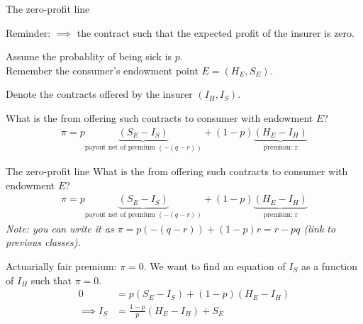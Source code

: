 \begin{frame}{The zero-profit line}

    Reminder:  $\implies$ the contract such that the expected profit of the insurer is zero.\\
    \vspace{2mm}
    \pause

    Assume the probablity of being sick is $p$.\\
    Remember the consumer's endowment point $E = (H_E, S_E)$.\\
    \vspace{2mm}
    \pause

    Denote the contracts offered by the insurer $(I_H, I_S)$.\\
    \vspace{2mm}
    \pause

    What is the  from offering such contracts to consumer with endowment $E$?
    \begin{align*}
        \pi = p \underbrace{( S_E - I_S )}_{\text{payout net of premium } (-(q-r))} + (1-p) \underbrace{( H_E - I_H )}_{\text{premium: r}} 
    \end{align*}
\end{frame}
\begin{frame}{The zero-profit line}
    What is the  from offering such contracts to consumer with endowment $E$?
    \begin{align*}
        \pi = p \underbrace{( S_E - I_S )}_{\text{payout net of premium } (-(q-r))} + (1-p) \underbrace{( H_E - I_H )}_{\text{premium: r}} 
    \end{align*}
    \textit{Note: you can write it as $\pi = p (-(q-r))  + (1-p) r = r - pq $ (link to previous classes).}
    \vspace{2mm}
    \pause

    Actuarially fair premium: $\pi = 0$. We want to find an equation of $I_S$ as a function of $I_H$ such that $\pi = 0$.
    \begin{align*}
        0 &= p ( S_E - I_S ) + (1-p) ( H_E - I_H ) \\
        \implies I_S &= \frac{1-p}{p} ( H_E - I_H ) + S_E
    \end{align*}

\end{frame}
